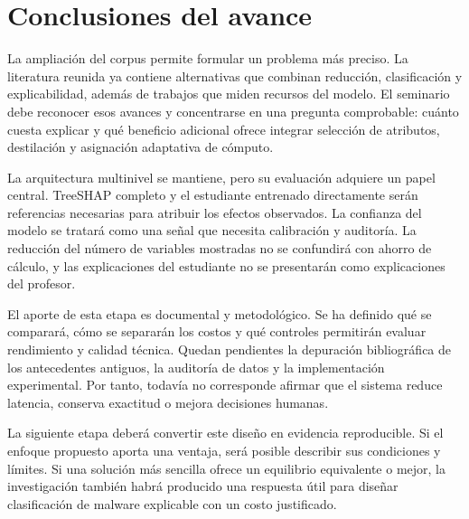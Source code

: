 \chapter{Conclusiones del avance}
La ampliación del corpus permite formular un problema más preciso. La literatura reunida ya contiene alternativas que combinan reducción, clasificación y explicabilidad, además de trabajos que miden recursos del modelo. El seminario debe reconocer esos avances y concentrarse en una pregunta comprobable: cuánto cuesta explicar y qué beneficio adicional ofrece integrar selección de atributos, destilación y asignación adaptativa de cómputo.

La arquitectura multinivel se mantiene, pero su evaluación adquiere un papel central. TreeSHAP completo y el estudiante entrenado directamente serán referencias necesarias para atribuir los efectos observados. La confianza del modelo se tratará como una señal que necesita calibración y auditoría. La reducción del número de variables mostradas no se confundirá con ahorro de cálculo, y las explicaciones del estudiante no se presentarán como explicaciones del profesor.

El aporte de esta etapa es documental y metodológico. Se ha definido qué se comparará, cómo se separarán los costos y qué controles permitirán evaluar rendimiento y calidad técnica. Quedan pendientes la depuración bibliográfica de los antecedentes antiguos, la auditoría de datos y la implementación experimental. Por tanto, todavía no corresponde afirmar que el sistema reduce latencia, conserva exactitud o mejora decisiones humanas.

La siguiente etapa deberá convertir este diseño en evidencia reproducible. Si el enfoque propuesto aporta una ventaja, será posible describir sus condiciones y límites. Si una solución más sencilla ofrece un equilibrio equivalente o mejor, la investigación también habrá producido una respuesta útil para diseñar clasificación de malware explicable con un costo justificado.
